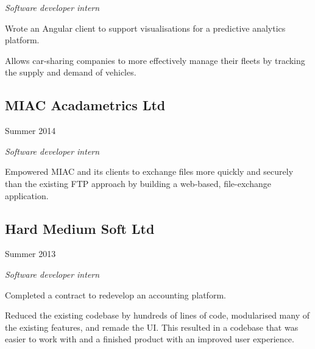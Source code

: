 \emph{Software developer intern}

\begin{itemize}
  {\small
  \item Wrote an Angular client to support visualisations for a predictive
    analytics platform.
  \item Allows car-sharing companies to more effectively manage their fleets by
    tracking the supply and demand of vehicles.
  }
\end{itemize}

\noindent\begin{minipage}[t]{0.5\textwidth}
  \subsection*{MIAC Acadametrics Ltd}
\end{minipage}
\noindent\begin{minipage}[t]{0.5\textwidth}
  \flushright
  Summer 2014
\end{minipage}

\emph{Software developer intern}

\begin{itemize}
  {\small
  \item Empowered MIAC and its clients to exchange files more quickly and
    securely than the existing FTP approach by building a web-based,
    file-exchange application.
  }
\end{itemize}

\noindent\begin{minipage}[t]{0.5\textwidth}
  \subsection*{Hard Medium Soft Ltd}
\end{minipage}
\noindent\begin{minipage}[t]{0.5\textwidth}
  \flushright
  Summer 2013
\end{minipage}

\emph{Software developer intern}

\begin{itemize}
  {\small
  \item Completed a contract to redevelop an accounting platform.
  \item Reduced the existing codebase by hundreds of lines of code, modularised
    many of the existing features, and remade the UI. This resulted in a
    codebase that was easier to work with and a finished product with an
    improved user experience.
  }
\end{itemize}

